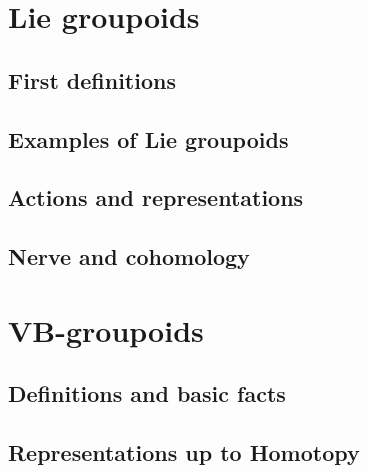 
\chapter{Lie groupoids}\label{ch:lie-gpds}

\section{First definitions}



\section{Examples of Lie groupoids}



\section{Actions and representations}



\section{Nerve and cohomology}




\chapter{VB-groupoids}\label{ch:vb-gpds}

\section{Definitions and basic facts}\label{sec:VBgpds}



\section{Representations up to Homotopy}

